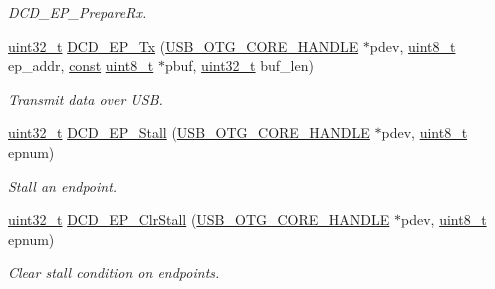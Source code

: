 \begin{DoxyCompactItemize}
\begin{DoxyCompactList}\small\item\em D\-C\-D\-\_\-\-E\-P\-\_\-\-Prepare\-Rx. \end{DoxyCompactList}\item 
\hyperlink{stdint_8h_a435d1572bf3f880d55459d9805097f62}{uint32\-\_\-t} \hyperlink{group___u_s_b___d_c_d___exported___functions_prototype_gad55cbc7c1e8666257b9a3918b80effa3}{D\-C\-D\-\_\-\-E\-P\-\_\-\-Tx} (\hyperlink{group___u_s_b___c_o_r_e___exported___types_gaf76054c11eb8a3367907aad7ae700e80}{U\-S\-B\-\_\-\-O\-T\-G\-\_\-\-C\-O\-R\-E\-\_\-\-H\-A\-N\-D\-L\-E} $\ast$pdev, \hyperlink{stdint_8h_aba7bc1797add20fe3efdf37ced1182c5}{uint8\-\_\-t} ep\-\_\-addr, \hyperlink{group___n_a_m_e_ga7ae6d0e43244213b34de2c2b9aa30da6}{const} \hyperlink{stdint_8h_aba7bc1797add20fe3efdf37ced1182c5}{uint8\-\_\-t} $\ast$pbuf, \hyperlink{stdint_8h_a435d1572bf3f880d55459d9805097f62}{uint32\-\_\-t} buf\-\_\-len)
\begin{DoxyCompactList}\small\item\em Transmit data over U\-S\-B. \end{DoxyCompactList}\item 
\hyperlink{stdint_8h_a435d1572bf3f880d55459d9805097f62}{uint32\-\_\-t} \hyperlink{group___u_s_b___d_c_d___exported___functions_prototype_ga9c6f692cb2607db05b83073dc67bc429}{D\-C\-D\-\_\-\-E\-P\-\_\-\-Stall} (\hyperlink{group___u_s_b___c_o_r_e___exported___types_gaf76054c11eb8a3367907aad7ae700e80}{U\-S\-B\-\_\-\-O\-T\-G\-\_\-\-C\-O\-R\-E\-\_\-\-H\-A\-N\-D\-L\-E} $\ast$pdev, \hyperlink{stdint_8h_aba7bc1797add20fe3efdf37ced1182c5}{uint8\-\_\-t} epnum)
\begin{DoxyCompactList}\small\item\em Stall an endpoint. \end{DoxyCompactList}\item 
\hyperlink{stdint_8h_a435d1572bf3f880d55459d9805097f62}{uint32\-\_\-t} \hyperlink{group___u_s_b___d_c_d___exported___functions_prototype_gabdb4ba47ac9d83d0690d425bb616d83d}{D\-C\-D\-\_\-\-E\-P\-\_\-\-Clr\-Stall} (\hyperlink{group___u_s_b___c_o_r_e___exported___types_gaf76054c11eb8a3367907aad7ae700e80}{U\-S\-B\-\_\-\-O\-T\-G\-\_\-\-C\-O\-R\-E\-\_\-\-H\-A\-N\-D\-L\-E} $\ast$pdev, \hyperlink{stdint_8h_aba7bc1797add20fe3efdf37ced1182c5}{uint8\-\_\-t} epnum)
\begin{DoxyCompactList}\small\item\em Clear stall condition on endpoints. \end{DoxyCompactList}\item 

\end{DoxyCompactItemize}
